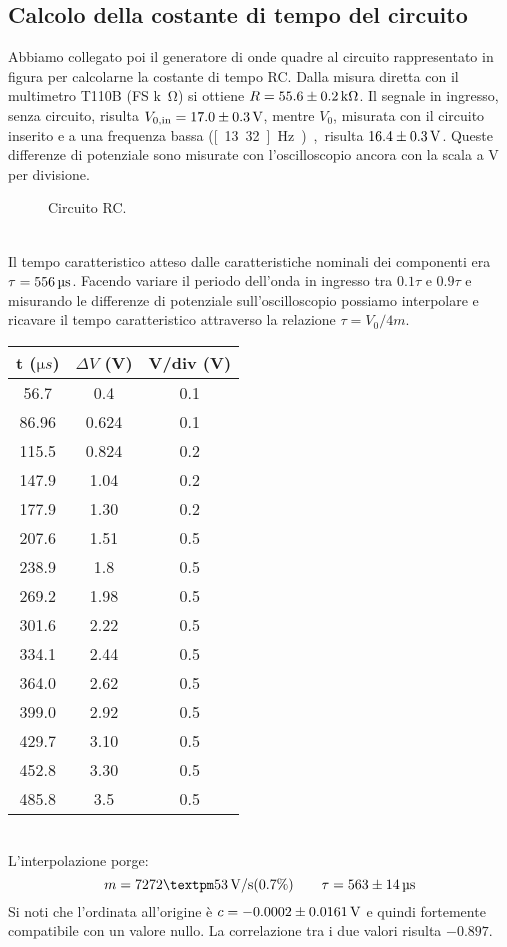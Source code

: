 \documentclass[italian,a4paper]{article}
\begin{document}
\subsection{Calcolo della costante di tempo del circuito}
Abbiamo collegato poi il generatore di onde quadre al circuito rappresentato in figura per calcolarne la costante di tempo RC. Dalla misura diretta con il multimetro T110B (FS \unit[200]{k\ohm}) si ottiene $R = \unit[55.6\pm0.2]{k\ohm}$. Il segnale in ingresso, senza circuito, risulta $V_{0,\text{in}} = \unit[17.0\pm0.3]{V}$, mentre $V_0$, misurata con il circuito inserito e a una frequenza bassa (\unit[13.32]{Hz}), risulta $\unit[16.4\pm0.3]{V}$. Queste differenze di potenziale sono misurate con l'oscilloscopio ancora con la scala a \unit[5]{V} per divisione.
\begin{figure}[h]\caption{Circuito RC.}
\centering

\end{figure}\\
Il tempo caratteristico atteso dalle caratteristiche nominali dei componenti era $\tau = \unit[556]{\micro s}$. Facendo variare il periodo dell'onda in ingresso tra $0.1\tau$ e $0.9\tau$ e misurando le differenze di potenziale sull'oscilloscopio possiamo interpolare e ricavare il tempo caratteristico attraverso la relazione $\tau = V_0/4m$.
\begin{table}[h]
\centering
 \begin{tabular}{*3c}
 t ($\unit{\micro s}$) &$\Delta V$ (\unit{V}) & V/div (\unit{V})  \\\hline
56.7 &0.4 &0.1\\
86.96 &0.624 &0.1\\
115.5 &0.824 &0.2\\
147.9 &1.04 &0.2\\
177.9 &1.30 &0.2\\
207.6 &1.51 &0.5\\
238.9 &1.8 &0.5\\
269.2 &1.98 &0.5\\
301.6 &2.22 &0.5\\
334.1 &2.44 &0.5\\
364.0 &2.62 &0.5\\
399.0 &2.92 &0.5\\
429.7 &3.10 &0.5\\
452.8 &3.30 &0.5\\
485.8 &3.5 &0.5
 \end{tabular}
\end{table}\\
L'interpolazione porge:
\begin{equation*}
m =  \unit[7272 ± 53]{V/s} (0.7\%) \qquad \tau = \unit[563\pm14]{\micro s}
\end{equation*}
Si noti che l'ordinata all'origine è $c =  \unit[-0.0002 \pm 0.0161]{V}$ e quindi fortemente compatibile con un valore nullo. La correlazione tra i due valori risulta $-0.897$.
\end{document}
